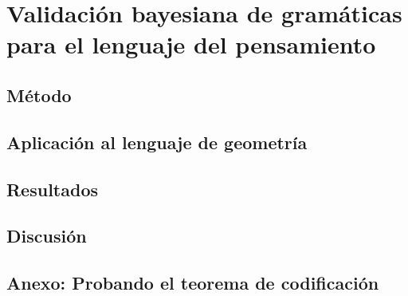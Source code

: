 \chapter{Validación bayesiana de gramáticas para el lenguaje del pensamiento}

\section{Método}
\section{Aplicación al lenguaje de geometría}
\section{Resultados}
\section{Discusión}
\section{Anexo: Probando el teorema de codificación}
